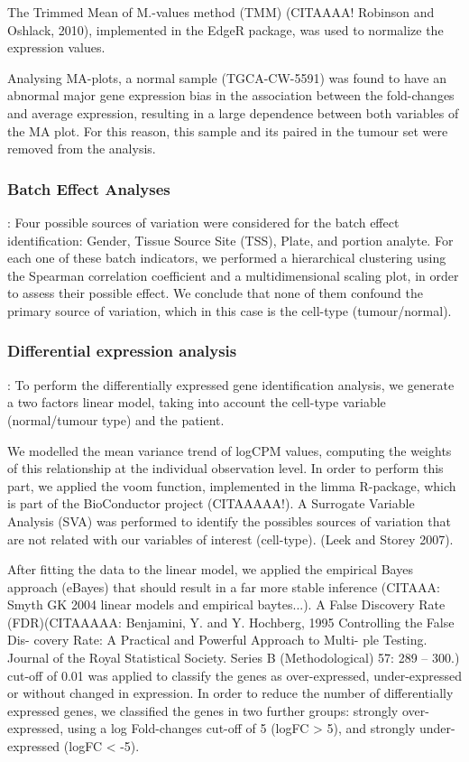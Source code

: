 \documentclass[9pt,twocolumn,twoside]{gsajnl}
\begin{document}
The Trimmed Mean of M.-values method (TMM) (CITAAAA! Robinson and Oshlack, 2010), implemented in the EdgeR package, was used to normalize the expression values.

Analysing MA-plots, a normal sample (TGCA-CW-5591) was found to have an abnormal major gene expression bias in the association between the fold-changes and average expression, resulting in a large dependence between both variables of the MA plot. For this reason, this sample and its paired in the tumour set were removed from the analysis.


\subsubsection*{Batch Effect Analyses}
: Four possible sources of variation were considered for the batch effect identification: Gender, Tissue Source Site (TSS), Plate, and portion analyte. For each one of these batch indicators, we performed a hierarchical clustering using the Spearman correlation coefficient and a multidimensional scaling plot, in order to assess their possible effect. We conclude that none of them confound the primary source of variation, which in this case is the cell-type (tumour/normal).

\subsubsection*{Differential expression analysis	}
: To perform the differentially expressed gene identification analysis, we generate a two factors linear model, taking into account the cell-type variable (normal/tumour type) and the patient.

We modelled the mean variance trend of logCPM values, computing the weights of this relationship at the individual observation level. In order to perform this part, we applied the voom function, implemented in the limma R-package, which is part of the BioConductor project (CITAAAAA!). A Surrogate Variable Analysis (SVA) was performed to identify the possibles sources of variation that are not related with our variables of interest (cell-type). (Leek and Storey 2007).

After fitting the data to the linear model, we applied the 	empirical Bayes approach (eBayes) that should result in a far more stable inference (CITAAA: Smyth GK 2004 linear models and empirical baytes...). A False Discovery Rate (FDR)(CITAAAAA: Benjamini, Y. and Y. Hochberg, 1995 Controlling the False Dis- covery Rate: A Practical and Powerful Approach to Multi- ple Testing. Journal of the Royal Statistical Society. Series B (Methodological) 57: 289 – 300.) cut-off of 0.01 was applied to classify the genes as over-expressed, under-expressed or without changed in expression. In order to reduce the number of differentially expressed genes, we classified the genes in two further groups: strongly over-expressed, using a log Fold-changes cut-off of 5 (logFC > 5), and strongly under-expressed (logFC < -5). 
\end{document}
